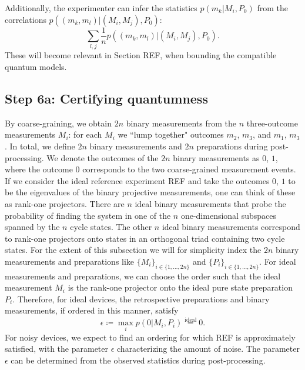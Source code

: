 Additionally, the experimenter can infer the statistics $p(m_k\vert M_i, P_0)$ from the correlations $p((m_k,m_l)\vert(M_i,M_j),P_0)$:
\begin{equation}
\sum_{l,j}\frac{1}{n}p((m_k,m_l)\vert (M_i,M_j),P_0).
\end{equation}
These will become relevant in Section REF, when bounding the compatible quantum models.
\subsection{Step 6a: Certifying quantumness}
By coarse-graining, we obtain $2n$ binary measurements from the $n$ three-outcome measurements $M_i$: for each $M_i$ we ``lump together" outcomes $m_2$, $m_3$, and $m_1$, $m_3$. In total, we define $2n$ binary measurements and $2n$ preparations during post-processing. We denote the outcomes of the $2n$ binary measurements as $0$, $1$, where the outcome $0$ corresponds to the two coarse-grained measurement events. If we consider the ideal reference experiment REF and take the outcomes $0$, $1$ to be the eigenvalues of the binary projective measurements, one can think of these as rank-one projectors. There are $n$ ideal binary measurements that probe the probability of finding the system in one of the $n$ one-dimensional subspaces spanned by the $n$ cycle states. The other $n$ ideal binary measurements correspond to rank-one projectors onto states in an orthogonal triad containing two cycle states. For the extent of this subsection we will for simplicity index the $2n$ binary measurements and preparations like $\{M_i\}_{i\in\{1,\dots,2n\}}$ and $\{P_i\}_{i\in\{1,\dots,2n\}}$. For ideal measurements and preparations, we can choose the order such that the ideal measurement $M_i$ is the rank-one projector onto the ideal pure state preparation $P_i$. Therefore, for ideal devices, the retrospective preparations and binary measurements, if ordered in this manner, satisfy \begin{equation}
\epsilon \coloneqq \max_i p(0\vert M_i, P_i)\stackrel{\text{ideal}}{=}0.
\end{equation} 
For noisy devices, we expect to find an ordering for which REF is approximately satisfied, with the parameter $\epsilon$ characterizing the amount of noise. The parameter $\epsilon$ can be determined from the observed statistics during post-processing.


